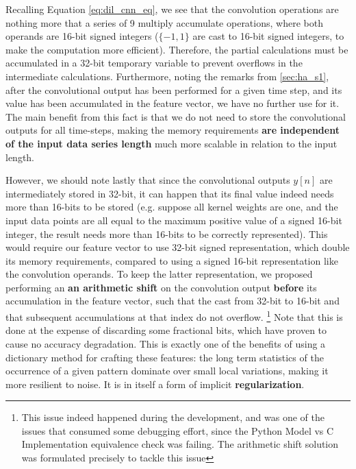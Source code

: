         Recalling Equation \ref{eq:dil_cnn_eq}, we see that the convolution operations are nothing more that a series of 9 multiply accumulate operations, 
        where both operands are 16-bit signed integers ($\{-1,1\}$ are cast to 16-bit signed integers, to make the computation more efficient). Therefore, the partial calculations
        must be accumulated in a 32-bit temporary variable to prevent overflows in the intermediate calculations. Furthermore, noting the remarks from \ref{sec:ha_s1}, after the convolutional
        output has been performed for a given time step, and its value has been accumulated in the feature vector, we have no further use for it. The main benefit from this fact is that we do not 
        need to store the convolutional outputs for all time-steps, making the memory requirements \textbf{are independent of the input data series length} much more scalable in relation to the input length.

        However, we should note lastly that since the convolutional outputs $y[n]$ are intermediately stored in 32-bit, it can happen that its final value indeed needs more than 16-bits to be stored
        (e.g. suppose all kernel weights are one, and the input data points are all equal to the maximum positive value of a signed 16-bit integer, the result needs more than 16-bits to be correctly represented).
        This would require our feature vector to use 32-bit signed representation, which double its memory requirements, compared to using a signed 16-bit representation like the convolution operands. To keep the latter
        representation, we proposed performing an \textbf{an arithmetic shift} on the convolution output \textbf{before} its accumulation in the feature vector, such that the cast from 32-bit to 16-bit and that subsequent accumulations at that index do not overflow.
        \footnote{This issue indeed happened during the development, and was one of the issues that consumed some debugging effort, since the Python Model vs C Implementation equivalence check was failing. 
        The arithmetic shift solution was formulated precisely to tackle this issue}
        Note that this is done at the expense of discarding some fractional bits, which have proven to cause no accuracy degradation. This is exactly one of the benefits of using a dictionary method for crafting these features: the
        long term statistics of the occurrence of a given pattern dominate over small local variations, making it more resilient to noise. It is in itself a form of implicit \textbf{regularization}.

